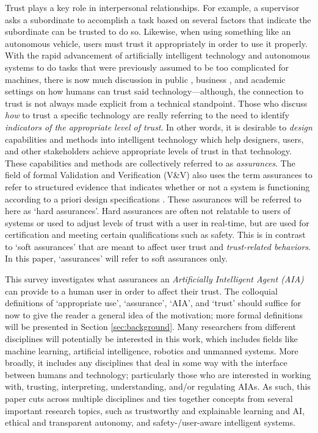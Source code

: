 Trust plays a key role in interpersonal relationships. For example, a supervisor asks a subordinate to accomplish a task based on several factors that indicate the subordinate can be trusted to do so. Likewise, when using something like an autonomous vehicle, users must trust it appropriately in order to use it properly. With the rapid advancement of artificially intelligent technology and autonomous systems to do tasks that were previously assumed to be too complicated for machines, there is now much discussion in public \cite{Spectrum2016-jv,DeSteno2014-cq,Wagner2016-ck}, business \cite{Banavar2016-nm, Khosravi2016-ke,Tankard2016-rk}, and academic settings \cite{Foley2017-qj,Castelvecchi2016-mr,Lahijanian2016-nd} on how humans can trust said technology---although, the connection to trust is not always made explicit from a technical standpoint. Those who discuss \emph{how} to trust a specific technology are really referring to the need to identify \emph{indicators of the appropriate level of trust}. 
In other words, it is desirable to \emph{design} capabilities and methods into intelligent technology which help designers, users, and other stakeholders achieve appropriate levels of trust in that technology. These capabilities and methods are collectively referred to as \textit{assurances}. The field of formal Validation and Verification (V\&V) also uses the term assurances to refer to structured evidence that indicates whether or not a system is functioning according to a priori design specifications \cite{Calinescu2017-fh}. These assurances will be referred to here as `hard assurances'. Hard assurances are often not relatable to users of systems or used to adjust levels of trust with a user in real-time, but are used for certification and meeting certain qualifications such as safety. This is in contrast to `soft assurances' that are meant to affect user trust and \emph{trust-related behaviors}. In this paper, `assurances' will refer to soft assurances only.
    
This survey investigates what assurances an \emph{Artificially Intelligent Agent (AIA)} can provide to a human user in order to affect their trust. The colloquial definitions of `appropriate use', `assurance', `AIA', and `trust' should suffice for now to give the reader a general idea of the motivation; more formal definitions will be presented in Section \ref{sec:background}. 
Many researchers from different disciplines will potentially be interested in this work, which includes fields like machine learning, artificial intelligence, robotics and unmanned systems. More broadly, it includes any disciplines that deal in some way with the interface between humans and technology; particularly those who are interested in working with, trusting, interpreting, understanding, and/or regulating AIAs. As such, this paper cuts across multiple disciplines and ties together concepts from several important research topics, such as trustworthy and explainable learning and AI, ethical and transparent autonomy, and safety-/user-aware intelligent systems.

